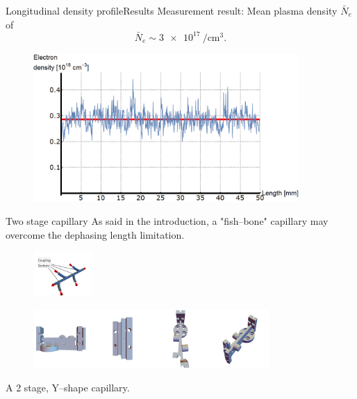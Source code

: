 \documentclass[]{beamer}
\begin{document}
  \begin{frame}{Longitudinal density profile}{Results}
    Measurement result: Mean plasma density $\bar{N}_e$ of
    \begin{equation*}
        \bar{N}_e \sim \SI{3e17}{\per\cubic\cm}.
    \end{equation*}
    \begin{figure}
      \includegraphics[width=0.9\textwidth]{figures/results/spectro/longitudinal_profile.png}
    \end{figure}
  \end{frame}
  \begin{frame}{Two stage capillary}
    As said in the introduction, a "fish--bone" capillary may overcome the dephasing length limitation.
     \begin{figure}
     \includegraphics[width=0.2\textwidth]{figures/coupling_scheme.pdf}
     \end{figure}
     \begin{figure}
     \includegraphics[width=0.8\textwidth]{figures/results/2stageCapillary/doublecapillary_cad.png}
     \end{figure}
     A 2 stage, Y--shape capillary.
  \end{frame}
\end{document}
